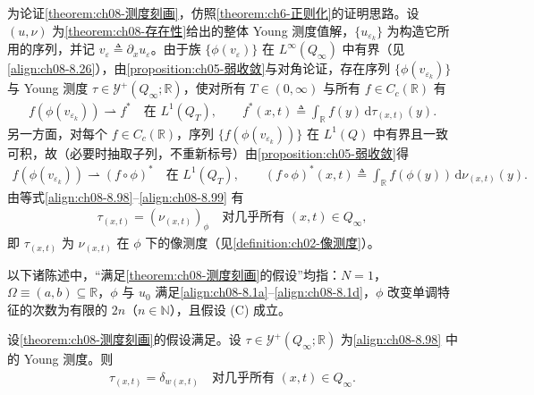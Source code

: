 \documentclass[../../main.tex]{subfiles}%
\begin{document}
为论证\cref{theorem:ch08-测度刻画}，仿照\cref{theorem:ch6-正则化}的证明思路。设 $(u,\nu)$ 为\cref{theorem:ch08-存在性}给出的整体 Young 测度值解，$\{u_{\varepsilon_k}\}$ 为构造它所用的序列，并记 $v_\varepsilon\triangleq\partial_xu_\varepsilon$。由于族 $\{\phi(v_\varepsilon)\}$ 在 $L^\infty(Q_\infty)$ 中有界（见\eqref{align:ch08-8.26}），由\cref{proposition:ch05-弱收敛}与对角论证，存在序列 $\{\phi(v_{\varepsilon_k})\}$ 与 Young 测度 $\tau\in\mathcal{Y}^+(Q_\infty;\mathbb{R})$，使对所有 $T\in(0,\infty)$ 与所有 $f\in C_c(\mathbb{R})$ 有
\begin{align}
f(\phi(v_{\varepsilon_k}))\rightharpoonup f^*\quad\text{在 }L^1(Q_T),\qquad
f^*(x,t)\triangleq\int_{\mathbb{R}}f(y)\,\mathrm{d}\tau_{(x,t)}(y). \label{align:ch08-8.98}
\end{align}
另一方面，对每个 $f\in C_c(\mathbb{R})$，序列 $\{f(\phi(v_{\varepsilon_k}))\}$ 在 $L^1(Q)$ 中有界且一致可积，故（必要时抽取子列，不重新标号）由\cref{proposition:ch05-弱收敛}得
\begin{align}
f(\phi(v_{\varepsilon_k}))\rightharpoonup(f\circ\phi)^*\quad\text{在 }L^1(Q_T),\qquad
(f\circ\phi)^*(x,t)\triangleq\int_{\mathbb{R}}f(\phi(y))\,\mathrm{d}\nu_{(x,t)}(y). \label{align:ch08-8.99}
\end{align}
由等式\eqref{align:ch08-8.98}--\eqref{align:ch08-8.99} 有
\begin{align}
\tau_{(x,t)}=(\nu_{(x,t)})_\phi\quad\text{对几乎所有 }(x,t)\in Q_\infty, \label{align:ch08-8.100}
\end{align}
即 $\tau_{(x,t)}$ 为 $\nu_{(x,t)}$ 在 $\phi$ 下的像测度（见\cref{definition:ch02-像测度}）。

以下诸陈述中，“满足\cref{theorem:ch08-测度刻画}的假设”均指：$N=1$，$\Omega\equiv(a,b)\subseteq\mathbb{R}$，$\phi$ 与 $u_0$ 满足\eqref{align:ch08-8.1a}--\eqref{align:ch08-8.1d}，$\phi$ 改变单调特征的次数为有限的 $2n$（$n\in\mathbb{N}$），且假设 (C) 成立。

\begin{theorem}\label{theorem:ch08-τ为Dirac}
设\cref{theorem:ch08-测度刻画}的假设满足。设 $\tau\in\mathcal{Y}^+(Q_\infty;\mathbb{R})$ 为\eqref{align:ch08-8.98} 中的 Young 测度。则
\begin{align}
\tau_{(x,t)}=\delta_{w(x,t)}\quad\text{对几乎所有 }(x,t)\in Q_\infty. \label{align:ch08-8.101}
\end{align}
\end{theorem}
\end{document}
